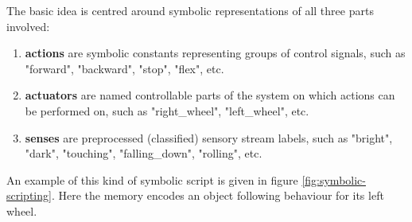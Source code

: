 \documentclass[a4paper,twoside]{article}
\begin{document}
The basic idea is centred around symbolic representations of all three parts involved:
\begin{enumerate}
	\item \textbf{actions} are symbolic constants representing groups of control signals, such as "forward", "backward", "stop", "flex", etc.
	
	\item \textbf{actuators} are named controllable parts of the system on which actions can be performed on, such as "right\_wheel", "left\_wheel", etc.
	
	\item \textbf{senses} are preprocessed (classified) sensory stream labels, such as "bright", "dark", "touching", "falling\_down", "rolling", etc.
\end{enumerate}

An example of this kind of symbolic script is given in figure \ref{fig:symbolic-scripting}. Here the memory encodes an object following behaviour for its left wheel.
\end{document}
